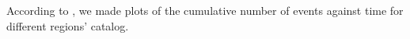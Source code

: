


According to \citet{Frankel1995}, we made plots of the cumulative number of events against time for different regions' catalog. 




